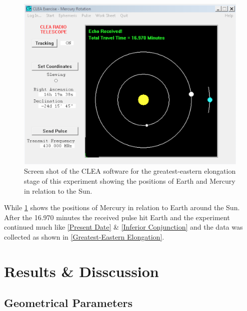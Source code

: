 \documentclass[11pt]{article}
\begin{document}
\begin{multicols}{2}
\begin{figure}[H]
\centering
\includegraphics[scale=0.4]{Great-East_Images.png/CLEA_Software.png}
\caption{Screen shot of the CLEA software for the greatest-eastern elongation stage of this experiment showing the positions of Earth and Mercury in relation to the Sun.}
\label{3-CLEA Software}
\end{figure}

While \cref{3-CLEA Software} shows the positions of Mercury in relation to Earth around the Sun. After the 16.970 minutes the received pulse hit Earth and the experiment continued much like \cref{Present Date} \& \cref{Inferior Conjunction} and the data was collected as shown in \cref{Greatest-Eastern Elongation}. \\


\section{Results \& Disscussion}\label{Results Disscussion}


\subsection{Geometrical Parameters}\label{Geometrical Parameters}


\end{multicols}
\end{document}
